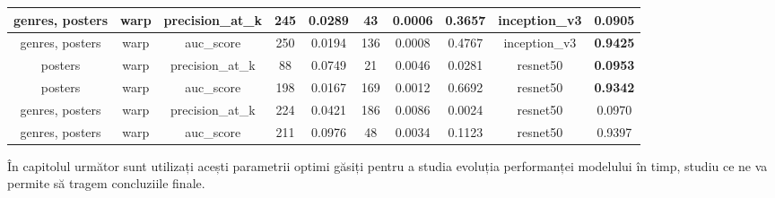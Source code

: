 \begin{table}
{\begin{tabular}{|c|c|c|c|c|c|c|c|c|c|}
\hline
genres, posters                    & warp                            & precision\_at\_k                    & 245             & 0.0289   & 43                     & 0.0006 & 0.3657   & inception\_v3                    & 0.0905                              \\ 
\hline
genres, posters                    & warp                            & auc\_score                          & 250             & 0.0194   & 136                    & 0.0008 & 0.4767    & inception\_v3                    & \textbf{0.9425}                              \\ 
\hline
posters                            & warp                            & precision\_at\_k                    & 88              & 0.0749    & 21                     & 0.0046  & 0.0281  & resnet50                         & \textbf{0.0953}                              \\ 
\hline
posters                            & warp                            & auc\_score                          & 198             & 0.0167   & 169                    & 0.0012 & 0.6692    & resnet50                         & \textbf{0.9342}                              \\ 
\hline
genres, posters                    & warp                            & precision\_at\_k                    & 224             & 0.0421    & 186                    & 0.0086  & 0.0024 & resnet50                         & 0.0970                              \\ 
\hline
genres, posters                    & warp                            & auc\_score                          & 211             & 0.0976    & 48                     & 0.0034  & 0.1123   & resnet50                         & 0.9397                              \\
\hline
\end{tabular}}
\end{table}

În capitolul următor sunt utilizați acești parametrii optimi găsiți pentru a studia evoluția performanței modelului în timp, studiu ce ne va permite să tragem concluziile finale.